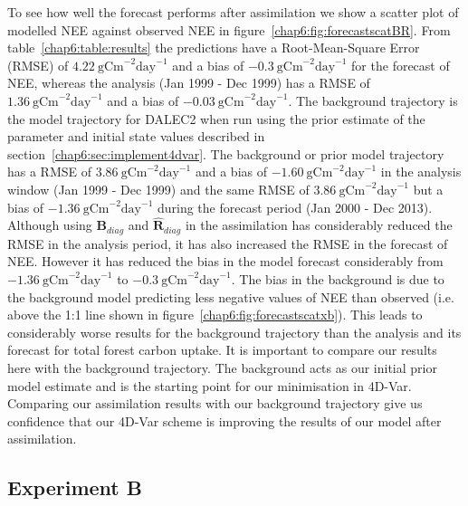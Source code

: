 To see how well the forecast performs after assimilation we show a scatter plot of modelled NEE against observed NEE in figure~\ref{chap6:fig:forecastscatBR}. From table~\ref{chap6:table:results} the predictions have a Root-Mean-Square Error (RMSE) of $4.22 ~\text{gCm}^{-2}\text{day}^{-1}$ and a bias of $-0.3 ~\text{gCm}^{-2}\text{day}^{-1}$ for the forecast of NEE, whereas the analysis (Jan 1999 - Dec 1999) has a RMSE of $1.36 ~\text{gCm}^{-2}\text{day}^{-1}$ and a bias of $-0.03 ~\text{gCm}^{-2}\text{day}^{-1}$. The background trajectory is the model trajectory for DALEC2 when run using the prior estimate of the parameter and initial state values described in section~\ref{chap6:sec:implement4dvar}. The background or prior model trajectory has a RMSE of $3.86 ~\text{gCm}^{-2}\text{day}^{-1}$ and a bias of $-1.60 ~\text{gCm}^{-2}\text{day}^{-1}$ in the analysis window (Jan 1999 - Dec 1999) and the same RMSE of $3.86 ~\text{gCm}^{-2}\text{day}^{-1}$ but a bias of $-1.36 ~\text{gCm}^{-2}\text{day}^{-1}$ during the forecast period (Jan 2000 - Dec 2013). Although using $\textbf{B}_{diag}$ and $\hat{\textbf{R}}_{diag}$ in the assimilation has considerably reduced the RMSE in the analysis period, it has also increased the RMSE in the forecast of NEE. However it has reduced the bias in the model forecast considerably from $-1.36 ~\text{gCm}^{-2}\text{day}^{-1}$ to $-0.3 ~\text{gCm}^{-2}\text{day}^{-1}$. The bias in the background is due to the background model predicting less negative values of NEE than observed (i.e. above the 1:1 line shown in figure~\ref{chap6:fig:forecastscatxb}). This leads to considerably worse results for the background trajectory than the analysis and its forecast for total forest carbon uptake. It is important to compare our results here with the background trajectory. The background acts as our initial prior model estimate and is the starting point for our minimisation in 4D-Var. Comparing our assimilation results with our background trajectory give us confidence that our 4D-Var scheme is improving the results of our model after assimilation.

\subsection{Experiment B} \label{chap6:sec:expb}

